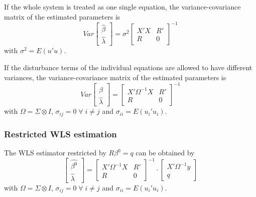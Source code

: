 \documentclass[article]{jss}
\begin{document}
If the whole system is treated as one single equation, 
the variance-covariance matrix of the estimated parameters is
\begin{equation}
   Var 
   \left[ \begin{array}{c}
      \widehat{\beta} \\ \widehat{\lambda}
   \end{array} \right] 
   = \sigma^2 
   \left[ \begin{array}{cc}
      X' X & R' \\ 
      R & 0
   \end{array} \right]^{-1}
\end{equation}
with $\sigma^2 = E \left( u' u \right)$.

If the disturbance terms of the individual equations 
are allowed to have different variances, 
the variance-covariance matrix of the estimated parameters is
\begin{equation}
   Var 
   \left[ \begin{array}{c}
      \widehat{\beta} \\ \widehat{\lambda}
   \end{array} \right] 
   = 
   \left[ \begin{array}{cc}
      X' \Omega^{-1} X & R' \\ 
      R & 0
   \end{array} \right]^{-1}
\end{equation}
with $\Omega = \Sigma \otimes I$, 
$\sigma_{ij} = 0 \; \forall \; i \neq j$ and
$\sigma_{ii} = E \left( u_i' u_i \right)$.

\subsubsection{Restricted WLS estimation}

The WLS estimator restricted by $R \beta^0 = q$ can be obtained by
\begin{equation}
   \left[ \begin{array}{c}
      \widehat{\beta^0} \\ \widehat{\lambda}
   \end{array} \right]
   =
   \left[ \begin{array}{cc}
      X' \Omega^{-1} X & R' \\ 
      R & 0
   \end{array} \right]^{-1}
   \cdot
   \left[ \begin{array}{c}
      X' \Omega^{-1} y \\ q 
   \end{array} \right]
\end{equation}
with $\Omega = \Sigma \otimes I$, 
$\sigma_{ij} = 0 \; \forall \; i \neq j$ and
$\sigma_{ii} = E \left( u_i' u_i \right)$.
\end{document}
